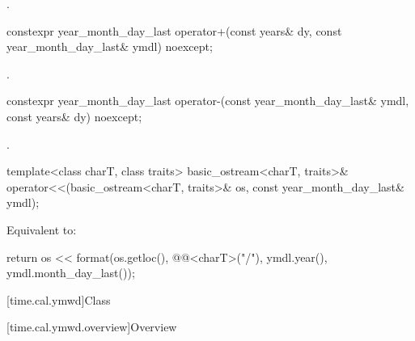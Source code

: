 \begin{itemdescr}
\pnum
\returns
{}.
\end{itemdescr}

%
\begin{itemdecl}
constexpr year_month_day_last
  operator+(const years& dy, const year_month_day_last& ymdl) noexcept;
\end{itemdecl}

\begin{itemdescr}
\pnum
\returns
{}.
\end{itemdescr}

%
\begin{itemdecl}
constexpr year_month_day_last
  operator-(const year_month_day_last& ymdl, const years& dy) noexcept;
\end{itemdecl}

\begin{itemdescr}
\pnum
\returns
{}.
\end{itemdescr}

%
\begin{itemdecl}
template<class charT, class traits>
  basic_ostream<charT, traits>&
    operator<<(basic_ostream<charT, traits>& os, const year_month_day_last& ymdl);
\end{itemdecl}

\begin{itemdescr}
\pnum
\effects
Equivalent to:
\begin{codeblock}
return os << format(os.getloc(), @@<charT>("{}/{}"),
                    ymdl.year(), ymdl.month_day_last());
\end{codeblock}
\end{itemdescr}

[time.cal.ymwd]{Class }

[time.cal.ymwd.overview]{Overview}

